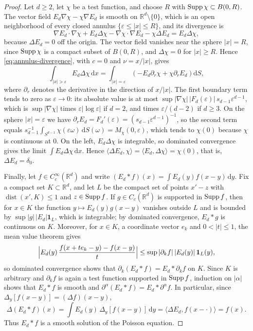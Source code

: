 \begin{proof}
Let $d\geq2$, let $\chi$ be a test function, and choose $R$ with $\operatorname{Supp}\chi\subset B(0,R)$. The vector field $E_d\nabla\chi-\chi\nabla E_d$ is smooth on $\mathbb R^d\setminus\{0\}$, which is an open neighborhood of every closed annulus $\{\varepsilon\leq|x|\leq R\}$, and its divergence is
\[
 \nabla E_d\cdot\nabla\chi+E_d\Delta\chi-\nabla\chi\cdot\nabla E_d-\chi\Delta E_d=E_d\Delta\chi,
\]
because $\Delta E_d=0$ off the origin. The vector field vanishes near the sphere $|x|=R$, since $\operatorname{Supp}\chi$ is a compact subset of $B(0,R)$, and $\Delta\chi=0$ for $|x|\geq R$. Hence \eqref{eq:annulus-divergence}, with $c=0$ and $\nu=x/|x|$, gives
\[
 \int_{|x|>\varepsilon}E_d\Delta\chi\,\mathrm d x
 =\int_{|x|=\varepsilon}\left(-E_d\partial_r\chi+\chi\partial_rE_d\right)\mathrm d S,
\]
where $\partial_r$ denotes the derivative in the direction of $x/|x|$. The first boundary term tends to zero as $\varepsilon\to0$: its absolute value is at most $\sup|\nabla\chi|\,|F_d(\varepsilon)|\,s_{d-1}\varepsilon^{d-1}$, which is $\sup|\nabla\chi|$ times $\varepsilon|\log\varepsilon|$ if $d=2$, and times $\varepsilon/(d-2)$ if $d\geq3$. On the sphere $|x|=\varepsilon$ we have $\partial_rE_d=F_d'(\varepsilon)=(s_{d-1}\varepsilon^{d-1})^{-1}$, so the second term equals $s_{d-1}^{-1}\int_{S^{d-1}}\chi(\varepsilon\omega)\,\mathrm dS(\omega)=M_\chi(0,\varepsilon)$, which tends to $\chi(0)$ because $\chi$ is continuous at $0$. On the left, $E_d\Delta\chi$ is integrable, so dominated convergence gives the limit $\int E_d\Delta\chi\,\mathrm dx$. Hence $\langle\Delta E_d,\chi\rangle=\langle E_d,\Delta\chi\rangle=\chi(0)$, that is, $\Delta E_d=\delta_0$.

Finally, let $f\in C_c^\infty(\mathbb R^d)$ and write $(E_d*f)(x)=\int E_d(y)f(x-y)\,\mathrm dy$. Fix a compact set $K\subset\mathbb R^d$, and let $L$ be the compact set of points $x'-z$ with $\operatorname{dist}(x',K)\leq1$ and $z\in\operatorname{Supp} f$. If $g\in C_c(\mathbb R^d)$ is supported in $\operatorname{Supp} f$, then for $x\in K$ the function $y\mapsto E_d(y)g(x-y)$ vanishes outside $L$ and is bounded by $\sup|g|\,|E_d|\mathbf1_L$, which is integrable; by dominated convergence, $E_d*g$ is continuous on $K$. Moreover, for $x\in K$, a coordinate vector $e_k$ and $0<|t|\leq1$, the mean value theorem gives
\[
 \Bigl|E_d(y)\,\frac{f(x+te_k-y)-f(x-y)}t\Bigr|\leq\sup|\partial_kf|\,|E_d(y)|\,\mathbf1_L(y),
\]
so dominated convergence shows that $\partial_k(E_d*f)=E_d*\partial_kf$ on $K$. Since $K$ is arbitrary and $\partial_kf$ is again a test function supported in $\operatorname{Supp} f$, induction on $|\alpha|$ shows that $E_d*f$ is smooth and $\partial^\alpha(E_d*f)=E_d*\partial^\alpha f$. In particular, since $\Delta_y[f(x-y)]=(\Delta f)(x-y)$,
\[
 \Delta(E_d*f)(x)=\int E_d(y)\,\Delta_y[f(x-y)]\,\mathrm dy=\langle\Delta E_d,f(x-\cdot)\rangle=f(x).
\]
Thus $E_d*f$ is a smooth solution of the Poisson equation.
\end{proof}

